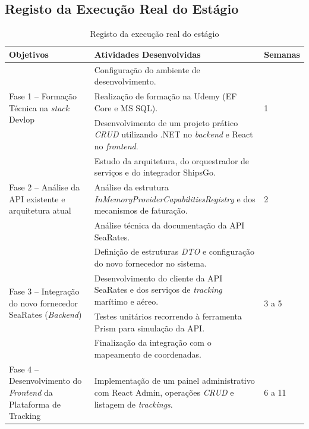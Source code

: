 \documentclass[a4paper,12pt]{report}
\begin{document}
\begin{appendices}
\chapter{Registo da Execução Real do Estágio}
\label{anx:execucao-real}
\newpage
\begin{table}[H]
\centering
\caption{Registo da execução real do estágio}
\label{tab:execucao-real}
\footnotesize
\renewcommand{\arraystretch}{0.95}
\begin{tabular}{|p{}|p{}|p{}|}
\hline
\textbf{Objetivos} & \textbf{Atividades Desenvolvidas} & \textbf{Semanas} \\
\hline
\multirow{3}{0.21\textwidth}{Fase 1 -- Formação Técnica na \textit{stack} Devlop}
& Configuração do ambiente de desenvolvimento.
& \multirow{3}{0.12\textwidth}{1} \\
\cline{2-2}
& Realização de formação na Udemy (EF Core e MS SQL). & \\
\cline{2-2}
& Desenvolvimento de um projeto prático \textit{CRUD} utilizando .NET no \textit{backend} e React no \textit{frontend}. & \\
\hline
\multirow{3}{0.21\textwidth}{Fase 2 -- Análise da API existente e arquitetura atual}
& Estudo da arquitetura, do orquestrador de serviços e do integrador ShipsGo.
& \multirow{3}{0.12\textwidth}{2} \\
\cline{2-2}
& Análise da estrutura \textit{InMemoryProvider\-CapabilitiesRegistry} e dos mecanismos de faturação. & \\
\cline{2-2}
& Análise técnica da documentação da API SeaRates. & \\
\hline
\multirow{4}{0.21\textwidth}{Fase 3 -- Integração do novo fornecedor SeaRates (\textit{Backend})}
& Definição de estruturas \textit{DTO} e configuração do novo fornecedor no sistema.
& \multirow{4}{0.12\textwidth}{3 a 5} \\
\cline{2-2}
& Desenvolvimento do cliente da API SeaRates e dos serviços de \textit{tracking} marítimo e aéreo. & \\
\cline{2-2}
& Testes unitários recorrendo à ferramenta Prism para simulação da API. & \\
\cline{2-2}
& Finalização da integração com o mapeamento de coordenadas. & \\
\hline
\multirow{4}{0.21\textwidth}{Fase 4 -- Desenvolvimento do \textit{Frontend} da Plataforma de Tracking}
& Implementação de um painel administrativo com React Admin, operações \textit{CRUD} e listagem de \textit{trackings}.
& \multirow{4}{0.12\textwidth}{6 a 11} \\

\end{tabular}
\end{table}
\end{appendices}
\end{document}
